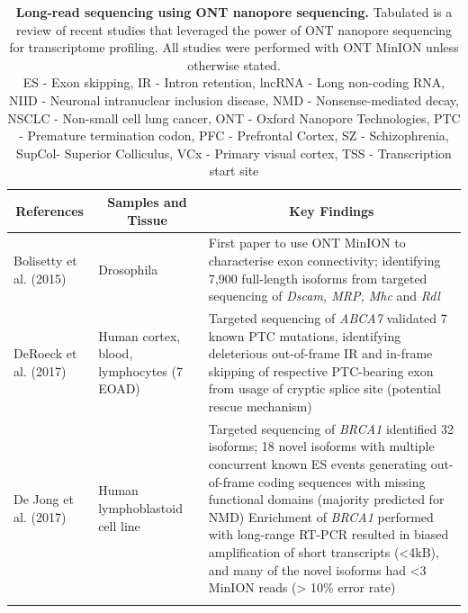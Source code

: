 \begin{landscape}
	\begin{longtable}[c]{p{4cm}p{4cm}p{18cm}}
		\caption[Long-read sequencing using ONT nanopore sequencing]%
		{\textbf{Long-read sequencing using ONT nanopore sequencing.} Tabulated is a review of recent studies that leveraged the power of ONT nanopore sequencing for transcriptome profiling. All studies were performed with ONT MinION unless otherwise stated. \newline ES - Exon skipping, IR - Intron retention, lncRNA - Long non-coding RNA, NIID - Neuronal intranuclear inclusion disease, NMD - Nonsense-mediated decay, NSCLC - Non-small cell lung cancer, ONT - Oxford Nanopore Technologies, PTC - Premature termination codon, PFC - Prefrontal Cortex, SZ - Schizophrenia, SupCol- Superior Colliculus, VCx - Primary visual cortex, TSS - Transcription start site}
		\label{tab: longread_ontstudies}\\
		
		\toprule
		\multicolumn{1}{c}{References} &
		\multicolumn{1}{c}{Samples and Tissue} &
		\multicolumn{1}{c}{Key Findings} \\* \midrule
		\endfirsthead
		\endhead
		\bottomrule
		\endfoot
		\endlastfoot
		\centering Bolisetty et al. (2015)\cite{Bolisetty2015} &
		\centering Drosophila &
		\tabitem First paper to use ONT MinION to characterise exon connectivity; identifying 7,900 full-length isoforms from targeted sequencing of \textit{Dscam, MRP, Mhc} and \textit{Rdl}  \\
		\hdashline[0.5pt/5pt]
		
		\centering DeRoeck et al. (2017)\cite{DeRoeck2017}  &
		\centering Human cortex, blood, lymphocytes (7 EOAD) &
		\tabitem Targeted sequencing of \textit{ABCA7} validated 7 known PTC mutations, identifying deleterious out-of-frame IR and in-frame skipping of respective PTC-bearing exon from usage of cryptic splice site (potential rescue mechanism) \\
		\hdashline[0.5pt/5pt]
		
		\centering De Jong et al. (2017)\cite{DeJong2017}  &
		\centering Human lymphoblastoid cell line &
		\tabitem Targeted sequencing of \textit{BRCA1} identified 32 isoforms; 18 novel isoforms with multiple concurrent known ES events generating out-of-frame coding sequences with missing functional domains (majority predicted for NMD) \newline
		\tabitem Enrichment of \textit{BRCA1} performed with long-range RT-PCR resulted in biased amplification of short transcripts (<4kB), and many of the novel isoforms had <3 MinION reads (> 10\% error rate)  \\
		\hdashline[0.5pt/5pt]
		

\end{longtable}
\end{landscape}
